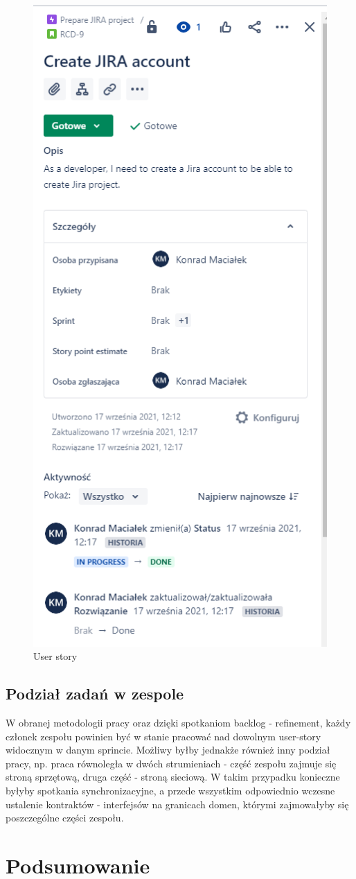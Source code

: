 \documentclass[10pt,a4paper]{scrartcl}
\begin{document}
		\begin{figure}[H]
			\centering
			\includegraphics[width=0.5\linewidth]{user_story}
			\caption[User story]{User story}
			\label{fig:userstory}
		\end{figure}
		
		\subsection{Podział zadań w zespole}
		W obranej metodologii pracy oraz dzięki spotkaniom backlog - refinement, każdy członek zespołu powinien być w stanie pracować nad dowolnym user-story widocznym w danym sprincie. Możliwy byłby jednakże również inny podział pracy, np. praca równoległa w dwóch strumieniach - część zespołu zajmuje się stroną sprzętową, druga część - stroną sieciową. W takim przypadku konieczne byłyby spotkania synchronizacyjne, a przede wszystkim odpowiednio wczesne ustalenie kontraktów - interfejsów na granicach domen, którymi zajmowałyby się poszczególne części zespołu.
		
		\section{Podsumowanie}
\end{document}
